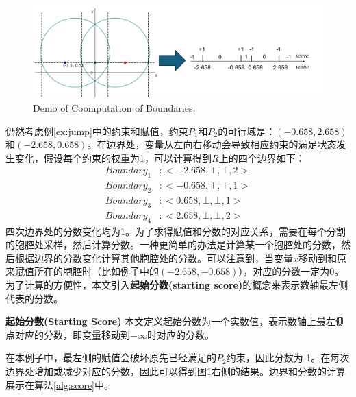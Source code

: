 \begin{example}
\label{ex:jump2}
\begin{figure}[t]
    \centering
    \includegraphics[width=\columnwidth]{Img/boundary.png}
     {Demo of Coomputation of Boundaries.}
\label{fig:boundary}
\end{figure}

仍然考虑例\ref{ex:jump}中的约束和赋值，约束$P_1$和$P_2$的可行域是：$(-0.658, 2.658)$和$(-2.658, 0.658)$。在边界处，变量从左向右移动会导致相应约束的满足状态发生变化，假设每个约束的权重为1，可以计算得到$R$上的四个边界如下：
\begin{align}
Boundary_1 &: <-2.658, \top, \top, 2> \nonumber \\
Boundary_2 &: <-0.658, \top, \top, 1> \nonumber \\
Boundary_3 &: <0.658, \bot, \bot, 1> \nonumber \\
Boundary_4 &: <2.658, \bot, \bot, 2> \nonumber
\end{align}
四次边界处的分数变化均为1。为了求得赋值和分数的对应关系，需要在每个分割的胞腔处采样，然后计算分数。一种更简单的办法是计算某一个胞腔处的分数，然后根据边界的分数变化计算其他胞腔处的分数。可以注意到，当变量$x$移动到和原来赋值所在的胞腔时（比如例子中的$(-2.658, -0.658)$），对应的分数一定为0。为了计算的方便性，本文引入\textbf{起始分数(starting score)}的概念来表示数轴最左侧代表的分数。

\begin{definition}{\textbf{起始分数(Starting Score)}}
本文定义起始分数为一个实数值，表示数轴上最左侧点对应的分数，即变量移动到$-\infty$时对应的分数。
\end{definition}
在本例子中，最左侧的赋值会破坏原先已经满足的$P_2$约束，因此分数为-1。在每次边界处增加或减少对应的分数，因此可以得到图\ref{fig:boundary}右侧的结果。边界和分数的计算展示在算法\ref{alg:score}中。
\end{example}

